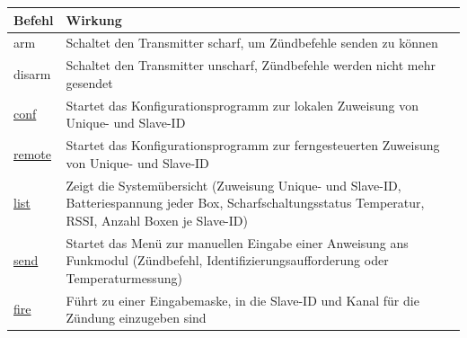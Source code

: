 \documentclass[paper=a4, parskip, numbers=noenddot, toc=listof, headsepline]{scrbook}
\begin{document}
				\begin{table}[bt]
					\begin{center}
						\begin{tabu}
							to .9\textwidth {lX}
							\hline\hline
							\textbf{Befehl}                       & \textbf{Wirkung}                                                                                                                                                                                                                   \\ \hline
							arm                                   & Schaltet den Transmitter scharf, um Zündbefehle senden zu können                                                                                                                                                                   \\
							disarm                                & Schaltet den Transmitter unscharf, Zündbefehle werden nicht mehr gesendet                                                                                                                                                          \\ \hline
							\hyperref[subsec:localconf]{conf}     & Startet das Konfigurationsprogramm zur lokalen Zuweisung von Unique- und Slave-ID                                                                                                                                                  \\
							\hyperref[subsec:remoteconf]{remote}  & Startet das Konfigurationsprogramm zur ferngesteuerten Zuweisung von Unique- und Slave-ID                                                                                                                                          \\
							\hyperref[sec:list]{list}             & Zeigt die Systemübersicht (Zuweisung Unique- und Slave-ID, Batteriespannung jeder Box, Scharfschaltungsstatus Temperatur, RSSI, Anzahl Boxen je Slave-ID)                                                                          \\ \hline
							\hyperref[sec:manuellessenden]{send}  & Startet das Menü zur manuellen Eingabe einer Anweisung ans Funkmodul (Zündbefehl, Identifizierungsaufforderung oder Temperaturmessung)                                                                                             \\
							\hyperref[sec:manuellessenden]{fire}  & Führt zu einer Eingabemaske, in die Slave-ID und Kanal für die Zündung einzugeben sind                                                                                                                                             \\

\end{tabu}
\end{center}
\end{table}
\end{document}
